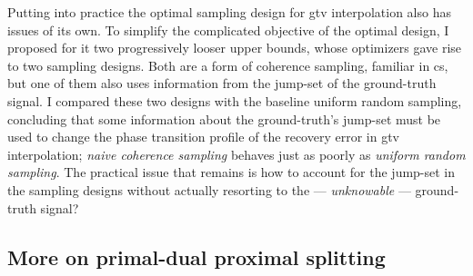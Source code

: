Putting into practice the optimal sampling design for \acrshort{gtv} interpolation also has issues of its own. To simplify the complicated objective of the optimal design, I proposed for it two progressively looser upper bounds, whose optimizers gave rise to two sampling designs. Both are a form of coherence sampling, familiar in \acrlong{cs}, but one of them also uses information from the jump-set of the ground-truth signal. I compared these two designs with the baseline uniform random sampling, concluding that some information about the ground-truth's jump-set must be used to change the phase transition profile of the recovery error in \acrshort{gtv} interpolation; \emph{naive coherence sampling} behaves just as poorly as \emph{uniform random sampling}. The practical issue that remains is how to account for the jump-set in the sampling designs without actually resorting to the --- \emph{unknowable} --- ground-truth signal?

\clearpage

\begin{subappendices}
    \section{More on primal-dual proximal splitting}\label{ap:primal_dual_prox_split}
    
\end{subappendices}